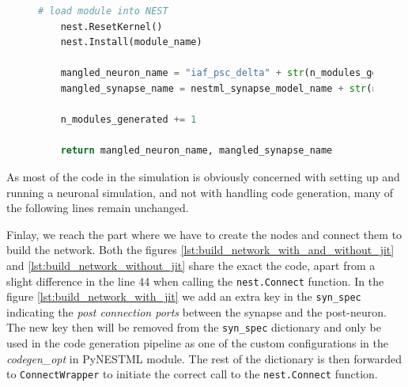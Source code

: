 \begin{figure}[ht!]
\begin{lstlisting}[language=Python, label=lst:generating_code, caption={The code-generation phase}]
    # load module into NEST
    nest.ResetKernel()
    nest.Install(module_name)

    mangled_neuron_name = "iaf_psc_delta" + str(n_modules_generated) + "_nestml__with_" + nestml_synapse_model_name + str(n_modules_generated) + "_nestml"
    mangled_synapse_name = nestml_synapse_model_name + str(n_modules_generated) + "_nestml__with_iaf_psc_delta" + str(n_modules_generated) + "_nestml"

    n_modules_generated += 1

    return mangled_neuron_name, mangled_synapse_name
\end{lstlisting}

\end{figure}

As most of the code in the simulation is obviously concerned with setting up and running a neuronal simulation, and not with handling code generation, many of the following lines remain unchanged.



Finlay, we reach the part where we have to create the nodes and connect them to build the network. Both the figures \autoref{lst:build_network_with_and_without_jit} and \autoref{lst:build_network_without_jit} share the exact the code, apart from a slight difference in the line 44 when calling the \texttt{nest.Connect} function. In the figure \autoref{lst:build_network_with_jit} we add an extra key in the \texttt{syn\_spec} indicating the \emph{post connection ports} between the synapse and the post-neuron. The new key then will be removed from the \texttt{syn\_spec} dictionary and only be used in the code generation pipeline as one of the custom configurations in the \emph{codegen\_opt} in PyNESTML module. The rest of the dictionary is then forwarded to \texttt{ConnectWrapper} to initiate the correct call to the \texttt{nest.Connect} function.


